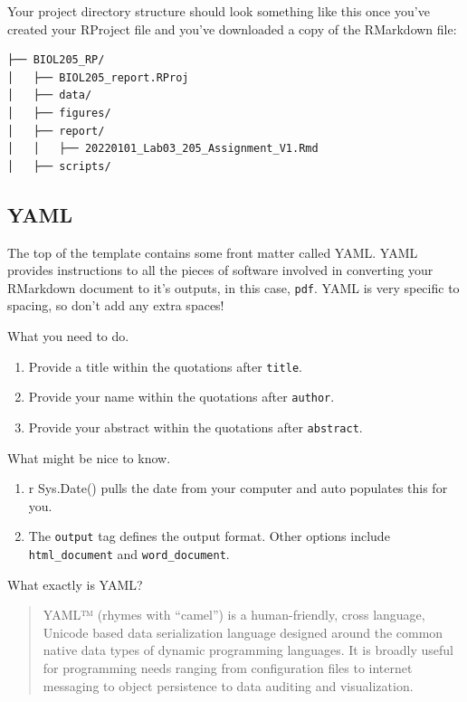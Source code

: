 \documentclass[
]{book}
\providecommand{\tightlist}{%
  \setlength{\itemsep}{0pt}\setlength{\parskip}{0pt}}
\begin{document}
Your project directory structure should look something like this once you've created your RProject file and you've downloaded a copy of the RMarkdown file:

\begin{verbatim}
├── BIOL205_RP/
│   ├── BIOL205_report.RProj
│   ├── data/
│   ├── figures/
│   ├── report/
│   │   ├── 20220101_Lab03_205_Assignment_V1.Rmd
│   ├── scripts/
\end{verbatim}

\hypertarget{yaml}{%
\subsection*{YAML}\label{yaml}}

The top of the template contains some front matter called YAML. YAML provides instructions to all the pieces of software involved in converting your RMarkdown document to it's outputs, in this case, \texttt{pdf}. YAML is very specific to spacing, so don't add any extra spaces!

What you need to do.

\begin{enumerate}
\def\labelenumi{\arabic{enumi}.}
\tightlist
\item
  Provide a title within the quotations after \texttt{title}.
\item
  Provide your name within the quotations after \texttt{author}.
\item
  Provide your abstract within the quotations after \texttt{abstract}.
\end{enumerate}

What might be nice to know.

\begin{enumerate}
\def\labelenumi{\arabic{enumi}.}
\tightlist
\item
  r Sys.Date() pulls the date from your computer and auto populates this for you.
\item
  The \texttt{output} tag defines the output format. Other options include \texttt{html\_document} and \texttt{word\_document}.
\end{enumerate}

What exactly is YAML?

\begin{quote}
YAML™ (rhymes with ``camel'') is a human-friendly, cross language, Unicode based data serialization language designed around the common native data types of dynamic programming languages. It is broadly useful for programming needs ranging from configuration files to internet messaging to object persistence to data auditing and visualization.
\end{quote}
\end{document}
